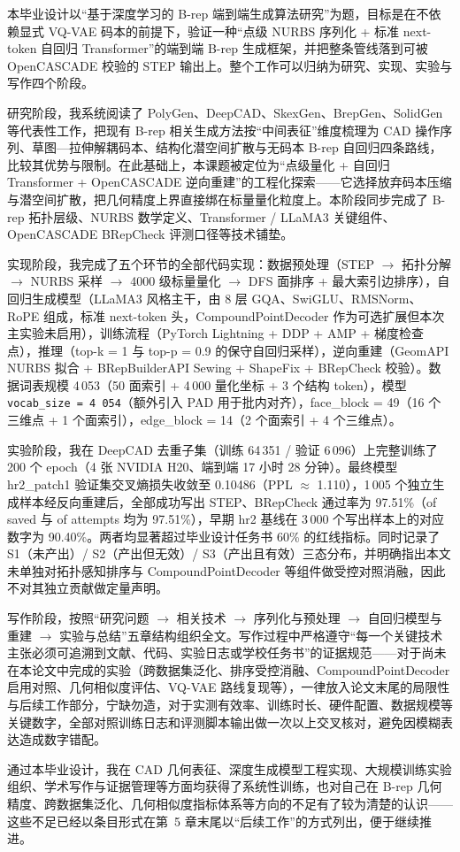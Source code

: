 
\begin{designsummary}
本毕业设计以“基于深度学习的 B-rep 端到端生成算法研究”为题，目标是在不依赖显式 VQ-VAE 码本的前提下，验证一种“点级 NURBS 序列化 + 标准 next-token 自回归 Transformer”的端到端 B-rep 生成框架，并把整条管线落到可被 OpenCASCADE 校验的 STEP 输出上。整个工作可以归纳为研究、实现、实验与写作四个阶段。

研究阶段，我系统阅读了 PolyGen、DeepCAD、SkexGen、BrepGen、SolidGen 等代表性工作，把现有 B-rep 相关生成方法按“中间表征”维度梳理为 CAD 操作序列、草图—拉伸解耦码本、结构化潜空间扩散与无码本 B-rep 自回归四条路线，比较其优势与限制。在此基础上，本课题被定位为“点级量化 + 自回归 Transformer + OpenCASCADE 逆向重建”的工程化探索——它选择放弃码本压缩与潜空间扩散，把几何精度上界直接绑在标量量化粒度上。本阶段同步完成了 B-rep 拓扑层级、NURBS 数学定义、Transformer / LLaMA3 关键组件、OpenCASCADE BRepCheck 评测口径等技术铺垫。

实现阶段，我完成了五个环节的全部代码实现：数据预处理（STEP $\to$ 拓扑分解 $\to$ NURBS 采样 $\to$ 4000 级标量量化 $\to$ DFS 面排序 + 最大索引边排序），自回归生成模型（LLaMA3 风格主干，由 8 层 GQA、SwiGLU、RMSNorm、RoPE 组成，标准 next-token 头，CompoundPointDecoder 作为可选扩展但本次主实验未启用），训练流程（PyTorch Lightning + DDP + AMP + 梯度检查点），推理（top-k = 1 与 top-p = 0.9 的保守自回归采样），逆向重建（GeomAPI NURBS 拟合 + BRepBuilderAPI Sewing + ShapeFix + BRepCheck 校验）。数据词表规模 4\,053（50 面索引 + 4\,000 量化坐标 + 3 个结构 token），模型 \texttt{vocab\_size = 4\,054}（额外引入 PAD 用于批内对齐），face\_block = 49（16 个三维点 + 1 个面索引），edge\_block = 14（2 个面索引 + 4 个三维点）。

实验阶段，我在 DeepCAD 去重子集（训练 64\,351 / 验证 6\,096）上完整训练了 200 个 epoch（4 张 NVIDIA H20、端到端 17 小时 28 分钟）。最终模型 hr2\_patch1 验证集交叉熵损失收敛至 0.10486（PPL $\approx$ 1.110），1\,005 个独立生成样本经反向重建后，全部成功写出 STEP、BRepCheck 通过率为 97.51\%（of saved 与 of attempts 均为 97.51\%），早期 hr2 基线在 3\,000 个写出样本上的对应数字为 90.40\%。两者均显著超过毕业设计任务书 60\% 的红线指标。同时记录了 S1（未产出）/ S2（产出但无效）/ S3（产出且有效）三态分布，并明确指出本文未单独对拓扑感知排序与 CompoundPointDecoder 等组件做受控对照消融，因此不对其独立贡献做定量声明。

写作阶段，按照“研究问题 $\to$ 相关技术 $\to$ 序列化与预处理 $\to$ 自回归模型与重建 $\to$ 实验与总结”五章结构组织全文。写作过程中严格遵守“每一个关键技术主张必须可追溯到文献、代码、实验日志或学校任务书”的证据规范——对于尚未在本论文中完成的实验（跨数据集泛化、排序受控消融、CompoundPointDecoder 启用对照、几何相似度评估、VQ-VAE 路线复现等），一律放入论文末尾的局限性与后续工作部分，宁缺勿造，对于实测有效率、训练时长、硬件配置、数据规模等关键数字，全部对照训练日志和评测脚本输出做一次以上交叉核对，避免因模糊表达造成数字错配。

通过本毕业设计，我在 CAD 几何表征、深度生成模型工程实现、大规模训练实验组织、学术写作与证据管理等方面均获得了系统性训练，也对自己在 B-rep 几何精度、跨数据集泛化、几何相似度指标体系等方向的不足有了较为清楚的认识——这些不足已经以条目形式在第~5 章末尾以“后续工作”的方式列出，便于继续推进。
\end{designsummary}

